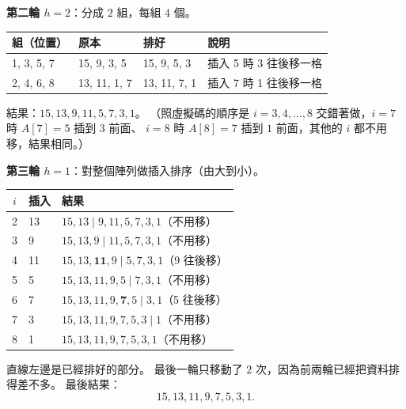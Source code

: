 \begin{pastsoln}
\textbf{第二輪 $h = 2$}：分成 $2$ 組，每組 $4$ 個。
\begin{center}
\small
\begin{tabular}{llll}
\toprule
組（位置） & 原本 & 排好 & 說明 \\
\midrule
1, 3, 5, 7 & 15, 9, 3, 5 & 15, 9, 5, 3 & 插入 5 時 3 往後移一格 \\
2, 4, 6, 8 & 13, 11, 1, 7 & 13, 11, 7, 1 & 插入 7 時 1 往後移一格 \\
\bottomrule
\end{tabular}
\end{center}
結果：$15, 13, 9, 11, 5, 7, 3, 1$。 （照虛擬碼的順序是 $i = 3, 4, \ldots, 8$ 交錯著做，$i = 7$ 時 $A[7] = 5$ 插到 $3$ 前面、
$i = 8$ 時 $A[8] = 7$ 插到 $1$ 前面，其他的 $i$ 都不用移，結果相同。）

\textbf{第三輪 $h = 1$}：對整個陣列做插入排序（由大到小）。
\begin{center}
\small
\begin{tabular}{cll}
\toprule
$i$ & 插入 & 結果 \\
\midrule
2 & 13 & $15, 13 \mid 9, 11, 5, 7, 3, 1$（不用移） \\
3 & 9 & $15, 13, 9 \mid 11, 5, 7, 3, 1$（不用移） \\
4 & 11 & $15, 13, \mathbf{11}, 9 \mid 5, 7, 3, 1$（9 往後移） \\
5 & 5 & $15, 13, 11, 9, 5 \mid 7, 3, 1$（不用移） \\
6 & 7 & $15, 13, 11, 9, \mathbf{7}, 5 \mid 3, 1$（5 往後移） \\
7 & 3 & $15, 13, 11, 9, 7, 5, 3 \mid 1$（不用移） \\
8 & 1 & $15, 13, 11, 9, 7, 5, 3, 1$（不用移） \\
\bottomrule
\end{tabular}
\end{center}
直線左邊是已經排好的部分。 最後一輪只移動了 $2$ 次，因為前兩輪已經把資料排得差不多。 最後結果：
\[
15, 13, 11, 9, 7, 5, 3, 1.
\]
\end{pastsoln}

